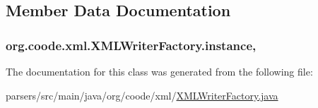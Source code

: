 \subsection{Member Data Documentation}
\hypertarget{classorg_1_1coode_1_1xml_1_1_x_m_l_writer_factory_ad944a1b44454b51ede73c1e7544e3114}{
\subsubsection[{instance}]{ org.\-coode.\-xml.\-X\-M\-L\-Writer\-Factory.\-instance\hspace{0.3cm}{\ttfamily [static]}, {\ttfamily [private]}}}\label{classorg_1_1coode_1_1xml_1_1_x_m_l_writer_factory_ad944a1b44454b51ede73c1e7544e3114}


The documentation for this class was generated from the following file\-:\begin{DoxyCompactItemize}
\item 
parsers/src/main/java/org/coode/xml/\hyperlink{_x_m_l_writer_factory_8java}{X\-M\-L\-Writer\-Factory.\-java}\end{DoxyCompactItemize}
